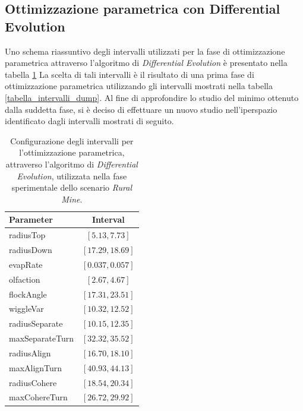 \subsection{Ottimizzazione parametrica con Differential Evolution}

Uno schema riassuntivo degli intervalli utilizzati per la fase di ottimizzazione parametrica attraverso l'algoritmo di \textit{Differential Evolution} è presentato nella tabella \ref{tabella_intervalli_ruralMine}
La scelta di tali intervalli è il risultato di una prima fase di ottimizzazione parametrica utilizzando gli intervalli mostrati nella tabella \ref{tabella_intervalli_dump}.
Al fine di approfondire lo studio del minimo ottenuto dalla suddetta fase, si è deciso di effettuare un nuovo studio nell'iperspazio identificato dagli intervalli mostrati di seguito.

\begin{table}[H]
    \centering
    \captionsetup{justification=centering, margin=2cm, font=footnotesize}
    \begin{tabular}{|l|c|}
    \hline
    \textbf{Parameter}              & \textbf{Interval}                 \\ \hline
    radiusTop                       & $[5.13,7.73]$                          \\ \hline
    radiusDown                      & $[17.29,18.69]$                         \\ \hline
    evapRate                        & $[0.037,0.057]$                      \\ \hline
    olfaction                       & $[2.67,4.67]$                          \\ \hline
    flockAngle                      & $[17.31,23.51]$                         \\ \hline
    wiggleVar                       & $[10.32,12.52]$                          \\ \hline
    radiusSeparate                  & $[10.15,12.35]$                          \\ \hline
    maxSeparateTurn                 & $[32.32,35.52]$                         \\ \hline
    radiusAlign                     & $[16.70,18.10]$                         \\ \hline
    maxAlignTurn                    & $[40.93,44.13]$                         \\ \hline
    radiusCohere                    & $[18.54,20.34]$                         \\ \hline
    maxCohereTurn                   & $[26.72,29.92]$                         \\ \hline
    \end{tabular}%
    
    \caption{Configurazione degli intervalli per l'ottimizzazione parametrica, attraverso l'algoritmo di \textit{Differential Evolution}, utilizzata nella fase sperimentale dello scenario \textit{Rural Mine}.}
    \label{tabella_intervalli_ruralMine}
\end{table}

